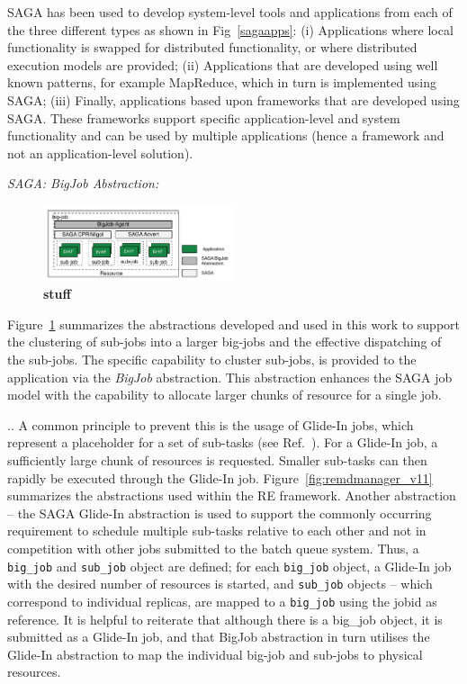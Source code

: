 \documentclass[conference,final]{IEEEtran}
\begin{document}
SAGA has been used to develop system-level tools and applications from
each of the three different types as shown in Fig~\ref{sagaapps}: (i)
Applications where local functionality is swapped for distributed
functionality, or where distributed execution models are provided;
(ii) Applications that are developed using well known patterns, for
example MapReduce, which in turn is implemented using SAGA; (iii)
Finally, applications based upon frameworks that are developed using
SAGA. These frameworks support specific application-level and system
functionality and can be used by multiple applications (hence a
framework and not an application-level solution).

{\it SAGA: BigJob Abstraction:}
\begin{figure}[t]
      \centering
      \includegraphics[width=0.50\textwidth]{./figures/enkf_bigjob.pdf}
      \caption{\footnotesize \bf stuff }
      \label{fig:abstractions}
\end{figure}
Figure~\ref{fig:abstractions} summarizes the abstractions developed
and used in this work to support the clustering of sub-jobs into a
larger big-jobs and the effective dispatching of the sub-jobs.  The
specific capability to cluster sub-jobs, is provided to the
application via the \emph{BigJob} abstraction. This abstraction
enhances the SAGA job model with the capability to allocate larger
chunks of resource for a single job.

.. A common principle to prevent this is the usage of Glide-In jobs,
which represent a placeholder for a set of sub-tasks (see
Ref.~\cite{citeulike:291860}).  For a Glide-In job, a sufficiently
large chunk of resources is requested. Smaller sub-tasks can then
rapidly be executed through the Glide-In job.
Figure~\ref{fig:remdmanager_v11} summarizes the abstractions used
within the RE framework.  Another abstraction -- the SAGA Glide-In
abstraction is used to support the commonly occurring requirement to
schedule multiple sub-tasks relative to each other and not in
competition with other jobs submitted to the batch queue system.
Thus, a \texttt{big\_job} and \texttt{sub\_job} object are defined;
for each \texttt{big\_job} object, a Glide-In job with the desired
number of resources is started, and \texttt{sub\_job} objects -- which
correspond to individual replicas, are mapped to a \texttt{big\_job}
using the jobid as reference. It is helpful to reiterate that although
there is a big\_job object, it is submitted as a Glide-In job, and
that BigJob abstraction in turn utilises the Glide-In abstraction to
map the individual big-job and sub-jobs to physical resources.
\end{document}
